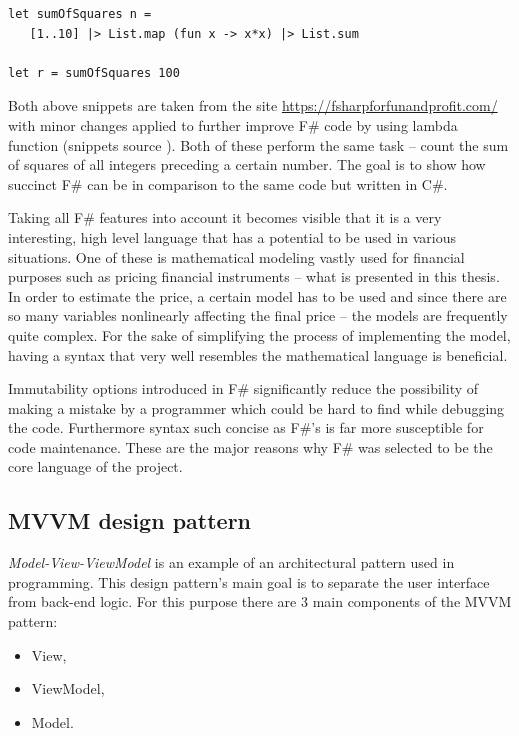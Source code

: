     \begin{lstlisting}[caption=F\# code example]
let sumOfSquares n = 
   [1..10] |> List.map (fun x -> x*x) |> List.sum

let r = sumOfSquares 100
    \end{lstlisting}
    
    Both above snippets are taken from the site \url{https://fsharpforfunandprofit.com/} with minor changes applied to further improve F\# code by using lambda function (snippets source \cite{compareCandF}). Both of these perform the same task -- count the sum of squares of all integers preceding a certain number. The goal is to show how succinct F\# can be in comparison to the same code but written in C\#.
    
    Taking all F\# features into account it becomes visible that it is a very interesting, high level language that has a potential to be used in various situations. One of these is mathematical modeling vastly used for financial purposes such as pricing financial instruments -- what is presented in this thesis. In order to estimate the price, a certain model has to be used and since there are so many variables nonlinearly affecting the final price -- the models are frequently quite complex. For the sake of simplifying the process of implementing the model, having a syntax that very well resembles the mathematical language is beneficial.
    
    Immutability options introduced in F\# significantly reduce the possibility of making a mistake by a programmer which could be hard to find while debugging the code. Furthermore syntax such concise as F\#'s is far more susceptible for code maintenance.
    These are the major reasons why F\# was selected to be the core language of the project.
\subsection{MVVM design pattern}
    \textit{Model-View-ViewModel} is an example of an architectural pattern used in programming. This design pattern's main goal is to separate the user interface from back-end logic. For this purpose there are 3 main components of the MVVM pattern:
    \begin{itemize}
        \item View,
        \item ViewModel,
        \item Model.
    \end{itemize}
    
